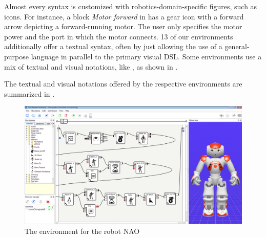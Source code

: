 Almost every syntax
is customized with robotics-domain-specific figures, such as icons. For instance, a block \emph{Motor forward} in \trik has a gear icon with a forward arrow depicting a forward-running motor. The user only specifies the motor power and the port in which the motor connects. 13 of our environments additionally offer a textual syntax, often by just allowing the use of a general-purpose language in parallel to the primary visual DSL. Some environments use a mix of textual and visual notations, like \easyc, as shown in .

The textual and visual notations offered by the respective environments are summarized in . 

\begin{figure}[t]
\vspace{-.4cm}
     \centering
    \includegraphics[width=\columnwidth]{fig/examples/choregraphe.jpg}
      \caption{The environment \choregraphe for the robot NAO}
      \label{fig:choregraphe}
			
   \end{figure}





